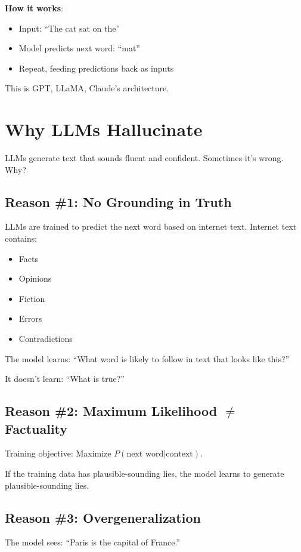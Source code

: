 \textbf{How it works}:
\begin{itemize}
\item Input: ``The cat sat on the''
\item Model predicts next word: ``mat''
\item Repeat, feeding predictions back as inputs
\end{itemize}

This is GPT, LLaMA, Claude's architecture.

\section{Why LLMs Hallucinate}

LLMs generate text that sounds fluent and confident. Sometimes it's wrong. Why?

\subsection{Reason \#1: No Grounding in Truth}

LLMs are trained to predict the next word based on internet text. Internet text contains:
\begin{itemize}
\item Facts
\item Opinions
\item Fiction
\item Errors
\item Contradictions
\end{itemize}

The model learns: ``What word is likely to follow in text that looks like this?''

It doesn't learn: ``What is true?''

\subsection{Reason \#2: Maximum Likelihood $\neq$ Factuality}

Training objective: Maximize $P(\text{next word} | \text{context})$.

If the training data has plausible-sounding lies, the model learns to generate plausible-sounding lies.

\subsection{Reason \#3: Overgeneralization}

The model sees: ``Paris is the capital of France.''

